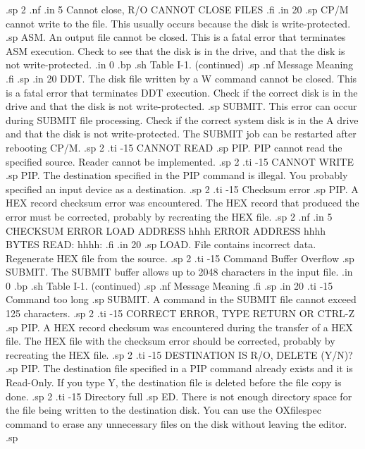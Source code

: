 .sp 2
.nf
.in 5
Cannot close, R/O
CANNOT CLOSE FILES
.fi
.in 20
.sp
CP/M cannot write to the file.  This usually occurs because the 
disk is write-protected.
.sp
ASM.  An output file cannot be closed.  This is a fatal error 
that terminates ASM execution.  Check to see that the disk is in 
the drive, and that the disk is not write-protected.
.in 0
.bp
.sh
                     Table I-1.  (continued)
.sp
.nf
     Message        Meaning
.fi
.sp
.in 20
DDT.  The disk file written by a W command cannot be closed.  
This is a fatal error that terminates DDT execution.  Check if 
the correct disk is in the drive and that the disk is not write-protected.
.sp
SUBMIT.  This error can occur during SUBMIT file processing.  
Check if the correct system disk is in the A drive and that the 
disk is not write-protected.  The SUBMIT job can be restarted 
after rebooting CP/M.
.sp 2
.ti -15
CANNOT READ
.sp
PIP.  PIP cannot read the specified source.  Reader cannot be 
implemented.
.sp 2
.ti -15
CANNOT WRITE
.sp
PIP.  The destination specified in the PIP command is illegal.  
You probably specified an input device as a destination.
.sp 2
.ti -15
Checksum error
.sp
PIP.  A HEX record checksum error was encountered.  The HEX 
record that produced the error must be corrected, probably by 
recreating the HEX file.
.sp 2
.nf
.in 5
CHECKSUM ERROR
LOAD ADDRESS hhhh
ERROR ADDRESS hhhh
BYTES READ:
hhhh:
.fi
.in 20
.sp
LOAD.  File contains incorrect data.  Regenerate HEX file from 
the source.
.sp 2
.ti -15
Command Buffer Overflow
.sp
SUBMIT.  The SUBMIT buffer allows up to 2048 characters in the 
input file.
.in 0
.bp
.sh
                     Table I-1.  (continued)
.sp
.nf
     Message        Meaning
.fi
.sp
.in 20
.ti -15
Command too long
.sp
SUBMIT.  A command in the SUBMIT file cannot exceed 125 
characters.
.sp 2
.ti -15
CORRECT ERROR, TYPE RETURN OR CTRL-Z
.sp
PIP.  A HEX record checksum was encountered during the transfer 
of a HEX file.  The HEX file with the checksum error should be 
corrected, probably by recreating the HEX file.
.sp 2
.ti -15
DESTINATION IS R/O, DELETE (Y/N)?
.sp
PIP.  The destination file specified in a PIP command already 
exists and it is Read-Only.  If you type Y, the destination file 
is deleted before the file copy is done.
.sp 2
.ti -15
Directory full
.sp
ED.  There is not enough directory space for the file being 
written to the destination disk.  You can use the OXfilespec 
command to erase any unnecessary files on the disk without 
leaving the editor.
.sp
